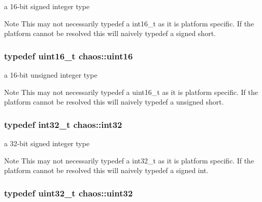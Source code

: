 a 16-\/bit signed integer type 

\begin{DoxyNote}{Note}
This may not necessarily {\ttfamily typedef} a {\ttfamily int16\+\_\+t} as it is platform specific. If the platform cannot be resolved this will naively {\ttfamily typedef} a {\ttfamily signed short}. 
\end{DoxyNote}
\hypertarget{namespacechaos_ac3888b1c9e56da7fbbdb3ab8425b4068}{}
\subsubsection[{uint16}]{\setlength{\rightskip}{0pt plus 5cm}typedef uint16\+\_\+t {\bf chaos\+::uint16}}\label{namespacechaos_ac3888b1c9e56da7fbbdb3ab8425b4068}


a 16-\/bit unsigned integer type 

\begin{DoxyNote}{Note}
This may not necessarily {\ttfamily typedef} a {\ttfamily uint16\+\_\+t} as it is platform specific. If the platform cannot be resolved this will naively {\ttfamily typedef} a {\ttfamily unsigned short}. 
\end{DoxyNote}
\hypertarget{namespacechaos_ad1de7efb430365afd2c9446a0f522a90}{}
\subsubsection[{int32}]{\setlength{\rightskip}{0pt plus 5cm}typedef int32\+\_\+t {\bf chaos\+::int32}}\label{namespacechaos_ad1de7efb430365afd2c9446a0f522a90}


a 32-\/bit signed integer type 

\begin{DoxyNote}{Note}
This may not necessarily {\ttfamily typedef} a {\ttfamily int32\+\_\+t} as it is platform specific. If the platform cannot be resolved this will naively {\ttfamily typedef} a {\ttfamily signed int}. 
\end{DoxyNote}
\hypertarget{namespacechaos_a3b3a47ba1e284655bf1a30c441121c60}{}
\subsubsection[{uint32}]{\setlength{\rightskip}{0pt plus 5cm}typedef uint32\+\_\+t {\bf chaos\+::uint32}}\label{namespacechaos_a3b3a47ba1e284655bf1a30c441121c60}


